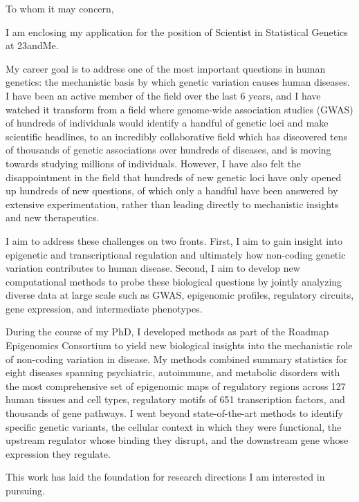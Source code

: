 \documentclass{letter}
\begin{document}
  \opening{To whom it may concern,}

  I am enclosing my application for the position of Scientist in Statistical
  Genetics at 23andMe.

  My career goal is to address one of the most important questions in human
  genetics: the mechanistic basis by which genetic variation causes human
  diseases. I have been an active member of the field over the last 6 years, and
  I have watched it transform from a field where genome-wide association studies
  (GWAS) of hundreds of individuals would identify a handful of genetic loci and
  make scientific headlines, to an incredibly collaborative field which has
  discovered tens of thousands of genetic associations over hundreds of diseases,
  and is moving towards studying millions of individuals. However, I have also
  felt the disappointment in the field that hundreds of new genetic loci have
  only opened up hundreds of new questions, of which only a handful have been
  answered by extensive experimentation, rather than leading directly to
  mechanistic insights and new therapeutics.

  I aim to address these challenges on two fronts. First, I aim to gain insight
  into epigenetic and transcriptional regulation and ultimately how non-coding
  genetic variation contributes to human disease. Second, I aim to develop new
  computational methods to probe these biological questions by jointly
  analyzing diverse data at large scale such as GWAS, epigenomic profiles,
  regulatory circuits, gene expression, and intermediate phenotypes.

  During the course of my PhD, I developed methods as part of the Roadmap
  Epigenomics Consortium to yield new biological insights into the mechanistic
  role of non-coding variation in disease. My methods combined summary statistics
  for eight diseases spanning psychiatric, autoimmune, and metabolic disorders
  with the most comprehensive set of epigenomic maps of regulatory regions across
  127 human tissues and cell types, regulatory motifs of 651 transcription
  factors, and thousands of gene pathways. I went beyond state-of-the-art methods
  to identify specific genetic variants, the cellular context in which they were
  functional, the upstream regulator whose binding they disrupt, and the
  downstream gene whose expression they regulate.

  This work has laid the foundation for research directions I am interested in
  pursuing.
\end{document}
